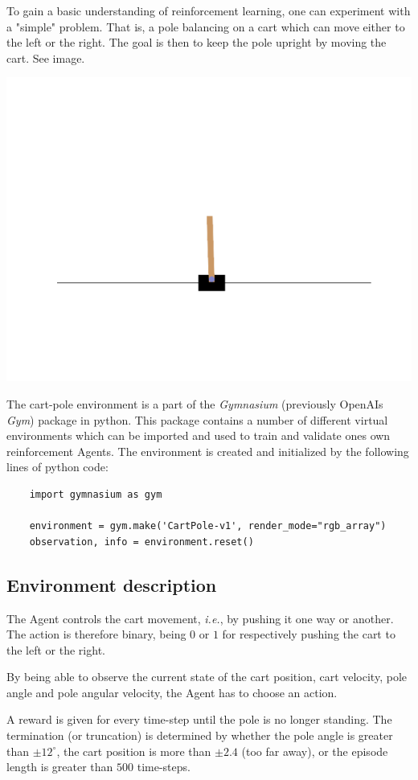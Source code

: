 \documentclass{article}
\renewenvironment{leftbar}[1][\hsize]{
    \def\FrameCommand{{\color{barcolor}\vrule width 2pt \hspace{10pt}}}
    \MakeFramed{\hsize#1 \advance\hsize-\width \FrameRestore}
}{\endMakeFramed}
\begin{document}
\begin{minipage}{.5\textwidth}
  To gain a basic understanding of reinforcement learning, one can experiment with a "simple" problem. That is, a pole balancing on a cart which can move either to the left or the right. The goal is then to keep the pole upright by moving the cart. See image.
\end{minipage}%
\begin{minipage}{.5\textwidth}
  \centering
  \includegraphics[width=.8\linewidth]{images/cart-pole.png}
\end{minipage}

The cart-pole environment is a part of the \textit{Gymnasium} (previously OpenAIs \textit{Gym}) package in python. This package contains a number of different virtual environments which can be imported and used to train and validate ones own reinforcement Agents. \cite{Gymnasium} \cite{Cart-pole} The environment is created and initialized by the following lines of python code:

\vspace{0.2cm}

\begin{lstlisting}
    import gymnasium as gym
    
    environment = gym.make('CartPole-v1', render_mode="rgb_array")
    observation, info = environment.reset()
\end{lstlisting}

\subsection*{Environment description}
\begin{leftbar}
    The Agent controls the cart movement, \textit{i.e.}, by pushing it one way or another. The action is therefore binary, being $0$ or $1$ for respectively pushing the cart to the left or the right.

    By being able to observe the current state of the cart position, cart velocity, pole angle and pole angular velocity, the Agent has to choose an action.

    A reward is given for every time-step until the pole is no longer standing. The termination (or truncation) is determined by whether the pole angle is greater than $\pm 12 ^\circ$, the cart position is more than $\pm 2.4$ (too far away), or the episode length is greater than $500$ time-steps.
\end{leftbar}
\end{document}
